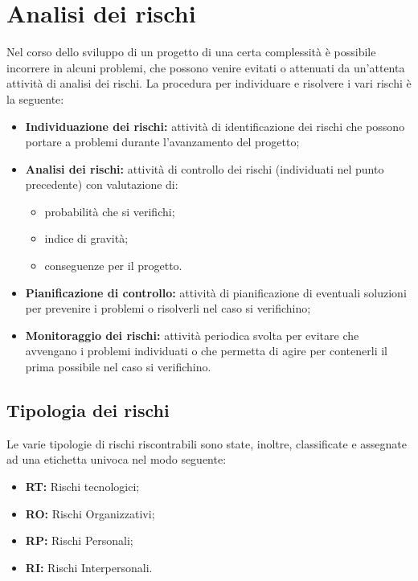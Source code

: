 \section{Analisi dei rischi}

Nel corso dello sviluppo di un progetto di una certa complessità è possibile incorrere in alcuni problemi, che possono venire evitati o attenuati da un'attenta attività di analisi dei rischi. La procedura per individuare e risolvere i vari rischi è la seguente:
\begin{itemize}
\item \textbf{Individuazione dei rischi:} attività di identificazione dei rischi che possono portare a problemi durante l'avanzamento del progetto;
\item \textbf{Analisi dei rischi:} attività di controllo dei rischi (individuati nel punto precedente) con valutazione di:
\begin{itemize}
\item probabilità che si verifichi;
\item indice di gravità;
\item conseguenze per il progetto.
\end{itemize}
\item \textbf{Pianificazione di controllo:} attività di pianificazione di eventuali soluzioni per prevenire i problemi o risolverli nel caso si verifichino;
\item \textbf{Monitoraggio dei rischi:} attività periodica svolta per evitare che avvengano i problemi individuati o che permetta di agire per contenerli il prima possibile nel caso si verifichino.
\end{itemize}

\subsection{Tipologia dei rischi}
Le varie tipologie di rischi riscontrabili sono state, inoltre, classificate e assegnate ad una etichetta univoca nel modo seguente:
\begin{itemize}
\item \textbf{RT:} Rischi tecnologici;
\item \textbf{RO:} Rischi Organizzativi;
\item \textbf{RP:} Rischi Personali;
\item \textbf{RI:} Rischi Interpersonali.
\end{itemize} 

